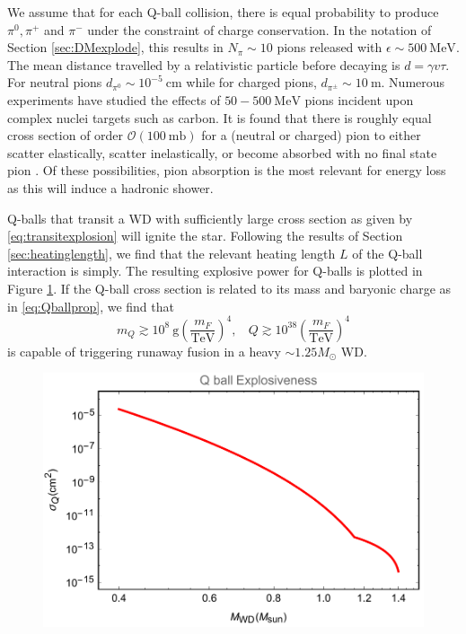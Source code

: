 \documentclass[twocolumn,showpacs,preprintnumbers,amsmath,amssymb,prd]{revtex4}
\newcommand{\OO}{\mathcal{O}}
\def\r{\right)}
\def\l{\left(}
\begin{document}
We assume that for each Q-ball collision, there is equal probability to produce $\pi^0, \pi^+$ and $\pi^-$ under the constraint of charge conservation. In the notation of Section \ref{sec:DMexplode}, this results in $N_{\pi} \sim 10$ pions released with $\epsilon \sim 500 ~\text{MeV}$. The mean distance travelled by a relativistic particle before decaying is $d = \gamma v \tau$. For neutral pions $d_{\pi^0} \sim 10^{-5} ~\text{cm}$ while for charged pions, $d_{\pi^\pm} \sim 10 ~\text{m}$. Numerous experiments have studied the effects of $50 - 500 ~\text{MeV}$ pions incident upon complex nuclei targets such as carbon. It is found that there is roughly equal cross section of order $\OO (100 ~\text{mb})$ for a (neutral or charged) pion to either scatter elastically, scatter inelastically, or become absorbed with no final state pion \cite{Pionnuclear}. Of these possibilities, pion absorption is the most relevant for energy loss as this will induce a hadronic shower.

Q-balls that transit a WD with sufficiently large cross section as given by \eqref{eq:transitexplosion} will ignite the star. Following the results of Section \ref{sec:heatinglength}, we find that the relevant heating length $L$ of the Q-ball interaction is simply. The resulting explosive power for Q-balls is plotted in Figure \ref{fig:boomQball}. If the Q-ball cross section is related to its mass and baryonic charge as in \eqref{eq:Qballprop}, we find that
\begin{equation}
m_Q \gtrsim 10^8 ~\text{g} \l\frac{m_F}{\text{TeV}}\r^4, ~~~~ Q \gtrsim 10^{38} \l\frac{m_F}{\text{TeV}}\r^4
\end{equation}
is capable of triggering runaway fusion in a heavy $\sim 1.25 M_{\odot}$ WD.

\begin{figure}
\label{fig:boomQball}
\includegraphics[scale=.45]{boomQball.pdf}
\end{figure}
\end{document}
